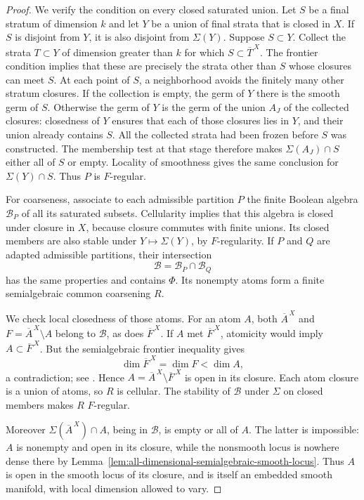 \begin{proof}
We verify the condition on every closed saturated union.  Let $S$ be
a final stratum of dimension $k$ and let $Y$ be a union of final
strata that is closed in $X$.  If $S$ is disjoint from $Y$, it is also
disjoint from $\Sigma(Y)$.  Suppose $S\subset Y$.  Collect the
strata $T\subset Y$ of dimension greater than $k$ for which
$S\subset\overline T^{\,X}$.  The frontier condition implies that
these are precisely the strata other than $S$ whose closures can
meet $S$.  At each point of $S$, a neighborhood avoids the finitely
many other stratum closures.  If the collection is empty, the germ
of $Y$ there is the smooth germ of $S$.  Otherwise the germ of $Y$
is the germ of the union $A_J$ of the collected closures: closedness
of $Y$ ensures that each of those closures lies in $Y$, and their
union already contains $S$.  All the collected strata had been
frozen before $S$ was constructed.  The membership test at that
stage therefore makes $\Sigma(A_J)\cap S$ either all of $S$ or
empty.  Locality of smoothness gives the same conclusion for
$\Sigma(Y)\cap S$.  Thus $P$ is $F$-regular.

For coarseness, associate to each admissible partition $P$ the finite
Boolean algebra $\mathcal B_P$ of all its saturated subsets.
Cellularity implies that this algebra is closed under closure in
$X$, because closure commutes with finite unions.  Its closed
members are also stable under $Y\mapsto\Sigma(Y)$, by
$F$-regularity.  If $P$ and $Q$ are adapted admissible partitions,
their intersection
\[
 \mathcal B=\mathcal B_P\cap\mathcal B_Q
\]
has the same properties and contains $\Phi$.  Its nonempty atoms
form a finite semialgebraic common coarsening $R$.

We check local closedness of those atoms.  For an atom $A$, both
$\overline A^{\,X}$ and
$F=\overline A^{\,X}\setminus A$ belong to $\mathcal B$, as does
$\overline F^{\,X}$.  If $A$ met $\overline F^{\,X}$, atomicity
would imply $A\subset\overline F^{\,X}$.  But the semialgebraic
frontier inequality gives
\[
 \dim\overline F^{\,X}=\dim F<\dim A,
\]
a contradiction; see \cite[Proposition~1.9, p.~5]{Coste2007}.
Hence $A=\overline A^{\,X}\setminus\overline F^{\,X}$ is open
in its closure.  Each atom closure is a union of atoms, so $R$ is
cellular.  The stability of $\mathcal B$ under $\Sigma$ on closed
members makes $R$ $F$-regular.

Moreover $\Sigma(\overline A^{\,X})\cap A$, being in
$\mathcal B$, is empty or all of $A$.  The latter is impossible:
$A$ is nonempty and open in its closure, while the nonsmooth locus
is nowhere dense there by
Lemma~\ref{lem:all-dimensional-semialgebraic-smooth-locus}.
Thus $A$ is open in the smooth locus of its closure, and is itself
an embedded smooth manifold, with local dimension allowed to vary.


\end{proof}

